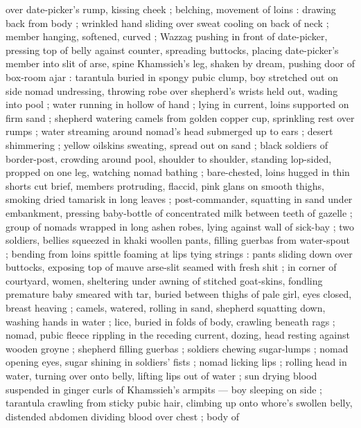 over date-picker's rump, kissing cheek ; belching, movement of loins : drawing back from body ;
wrinkled hand sliding over sweat cooling on back of neck ; member hanging, softened, curved ; Wazzag
pushing in front of date-picker, pressing top of belly against counter, spreading buttocks, placing
date-picker's member into slit of arse, spine {\semisplosion} Khamssieh's leg, shaken by dream,
pushing door of box-room ajar : tarantula buried in spongy pubic clump, boy stretched out on
side{\td} {\semislash} nomad undressing, throwing robe over shepherd's wrists held out, wading into
pool ; water running in hollow of hand ; lying in current, loins supported on firm sand ; shepherd
watering camels from golden copper cup, sprinkling rest over rumps ; water streaming around nomad's
head submerged up to ears ; desert shimmering ; yellow oilskins sweating, spread out on sand ; black
soldiers of border-post, crowding around pool, shoulder to shoulder, standing lop-sided, propped on
one leg, watching nomad bathing ; bare-chested, loins hugged in thin shorts cut brief, members
protruding, flaccid, pink glans on smooth thighs, smoking dried tamarisk in long %
leaves ; post-commander, squatting in sand under embankment, pressing baby-bottle of concentrated milk between teeth of gazelle ; group of nomads wrapped in long ashen robes, lying against wall of sick-bay ; two soldiers, bellies squeezed in khaki woollen pants, filling guerbas from water-spout ; bending from loins spittle foaming at lips tying strings : pants sliding down over buttocks, exposing top of mauve arse-slit seamed with fresh shit ; in corner of courtyard, 
women, sheltering under awning of stitched goat-skins, fondling 
premature baby smeared with tar, buried between thighs of pale girl, 
eyes closed, breast heaving ; camels, watered, rolling in sand, 
shepherd squatting down, washing hands in water ; lice, buried in 
folds of body, crawling beneath rags ; nomad, pubic fleece rippling 
in the receding current, dozing, head resting against wooden groyne 
; shepherd filling guerbas ; soldiers chewing sugar-lumps ; nomad 
opening eyes, sugar shining in soldiers' fists ; nomad licking lips ; 
rolling head in water, turning over onto belly, lifting lips out of water{\td} 
 ; sun drying blood suspended 
in ginger curls of Khamssieh's armpits --- boy sleeping on side ; 
tarantula crawling from sticky pubic hair, climbing up onto whore's 
swollen belly, distended abdomen dividing blood over chest ; body of 
